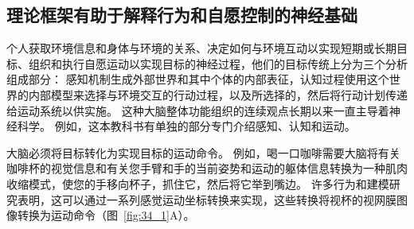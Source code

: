 \subsection{理论框架有助于解释行为和自愿控制的神经基础}

个人获取环境信息和身体与环境的关系、决定如何与环境互动以实现短期或长期目标、组织和执行自愿运动以实现目标的神经过程，他们的目标传统上分为三个分析组成部分：
感知机制生成外部世界和其中个体的内部表征，认知过程使用这个世界的内部模型来选择与环境交互的行动过程，以及所选择的，然后将行动计划传递给运动系统以供实施。
这种大脑整体功能组织的连续观点长期以来一直主导着神经科学。
例如，这本教科书有单独的部分专门介绍感知、认知和运动。


大脑必须将目标转化为实现目标的运动命令。
例如，喝一口咖啡需要大脑将有关咖啡杯的视觉信息和有关您手臂和手的当前姿势和运动的躯体信息转换为一种肌肉收缩模式，使您的手移向杯子，抓住它，然后将它举到嘴边。
许多行为和建模研究表明，这可以通过一系列感觉运动坐标转换来实现，这些转换将视杯的视网膜图像转换为运动命令（图~\ref{fig:34_1}A）。


